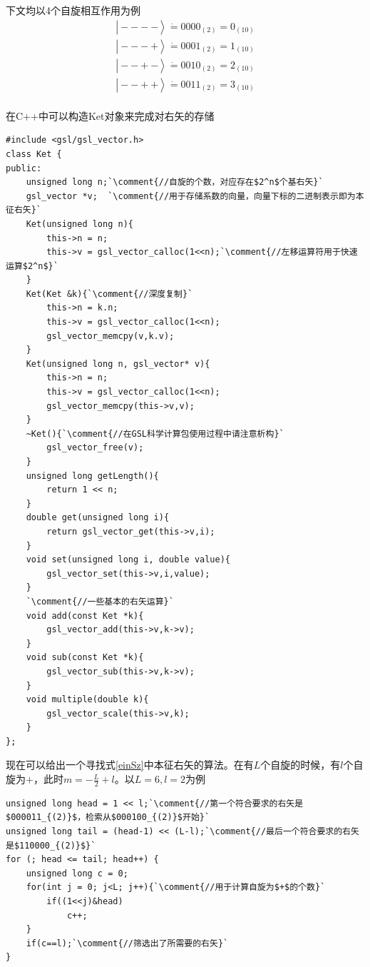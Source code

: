 \documentclass[UTF8,12pt]{article}
\providecommand\Ket[1]{\left|\right. #1 \left.\right\rangle}
\numberwithin{equation}{subsection}
\providecommand{\comment}[1]{\textcolor{commentcode}{#1}}
\begin{document}
	下文均以4个自旋相互作用为例\begin{align*}
		\Ket{----}\dot=0000_{(2)}=0_{(10)}\\
		\Ket{---+}\dot=0001_{(2)}=1_{(10)}\\
		\Ket{--+-}\dot=0010_{(2)}=2_{(10)}\\
		\Ket{--++}\dot=0011_{(2)}=3_{(10)}\\
	\end{align*}
	
	在C++中可以构造Ket对象来完成对右矢的存储
	\begin{lstlisting}
#include <gsl/gsl_vector.h>
class Ket {
public:
	unsigned long n;`\comment{//自旋的个数，对应存在$2^n$个基右矢}`
	gsl_vector *v;	`\comment{//用于存储系数的向量，向量下标的二进制表示即为本征右矢}`
	Ket(unsigned long n){
		this->n = n;
		this->v = gsl_vector_calloc(1<<n);`\comment{//左移运算符用于快速运算$2^n$}`
	}
	Ket(Ket &k){`\comment{//深度复制}`
		this->n = k.n;
		this->v = gsl_vector_calloc(1<<n);
		gsl_vector_memcpy(v,k.v);
	}
	Ket(unsigned long n, gsl_vector* v){
		this->n = n;
		this->v = gsl_vector_calloc(1<<n);
		gsl_vector_memcpy(this->v,v);
	}
	~Ket(){`\comment{//在GSL科学计算包使用过程中请注意析构}`
		gsl_vector_free(v);
	}
	unsigned long getLength(){
		return 1 << n;
	}
	double get(unsigned long i){
		return gsl_vector_get(this->v,i);
	}
	void set(unsigned long i, double value){
		gsl_vector_set(this->v,i,value);
	}
	`\comment{//一些基本的右矢运算}`
	void add(const Ket *k){
		gsl_vector_add(this->v,k->v);
	}
	void sub(const Ket *k){
		gsl_vector_sub(this->v,k->v);
	}
	void multiple(double k){
		gsl_vector_scale(this->v,k);
	}
};
	\end{lstlisting}
	
	现在可以给出一个寻找式\ref{einSz}中本征右矢的算法。在有$L$个自旋的时候，有$l$个自旋为$+$，此时$m=-\frac{L}{2}+l$。以$L=6,l=2$为例
	\begin{lstlisting}
unsigned long head = 1 << l;`\comment{//第一个符合要求的右矢是$000011_{(2)}$，检索从$000100_{(2)}$开始}`
unsigned long tail = (head-1) << (L-l);`\comment{//最后一个符合要求的右矢是$110000_{(2)}$}`
for (; head <= tail; head++) {
	unsigned long c = 0;
	for(int j = 0; j<L; j++){`\comment{//用于计算自旋为$+$的个数}`
		if((1<<j)&head)
			c++;
	}
	if(c==l);`\comment{//筛选出了所需要的右矢}`
}
	\end{lstlisting}
\end{document}
